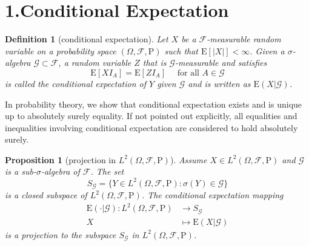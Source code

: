 \documentclass{report}
\newtheorem{definition}{Definition}[section]
\newtheorem{proposition}{Proposition}[section]
\theoremstyle{nonumberplain}
\begin{document}
\section*{1.Conditional Expectation}
\begin{definition}[conditional expectation]
	Let $X$ be a $\mathcal{F}$-measurable random variable on a probability space $(\Omega,\mathcal{F},\mathrm{P})$ such that $\mathrm{E}[\left|X\right|] < \infty$. Given a $\sigma$-algebra $\mathcal{G}\subset\mathcal{F}$, a random variable $Z$ that is $\mathcal{G}$-measurable and satisfies 
	\[
	\mathrm{E}[X I_A] = \mathrm{E}[ZI_A] \quad\text{ for all }A \in \mathcal{G}
	\] 
	is called the \emph{conditional expectation} of $Y$ given $\mathcal{G}$ and is written as $\mathrm{E}(X|\mathcal{G})$.
\end{definition}
In probability theory, we show that conditional expectation exists and is unique up to absolutely surely equality. If not pointed out explicitly, all equalities and inequalities involving conditional expectation are considered to hold absolutely surely. 

\begin{proposition}[projection in $L^2(\Omega,\mathcal{F},\mathrm{P})$]
	Assume $X\in L^2(\Omega,\mathcal{F},\mathrm{P})$ and $\mathcal{G}$ is a sub-$\sigma$-algebra of $\mathcal{F}$. The set
	\[
	S_\mathcal{G}=\{Y\in L^2(\Omega,\mathcal{F},\mathrm{P}):\sigma(Y)\in \mathcal{G}\}
	\]
	is a closed subspace of $L^2(\Omega,\mathcal{F},\mathrm{P})$.
	The conditional expectation mapping
	\begin{align*}
	\mathrm{E}(\cdot|\mathcal{G}):L^2(\Omega,\mathcal{F},\mathrm{P})&\longrightarrow S_\mathcal{G}\\
	X&\longmapsto \mathrm{E}(X|\mathcal{G})
	\end{align*}
	is a projection to the subspace $S_\mathcal{G}$ in $L^2(\Omega,\mathcal{F},\mathrm{P})$.
\end{proposition}
\end{document}
